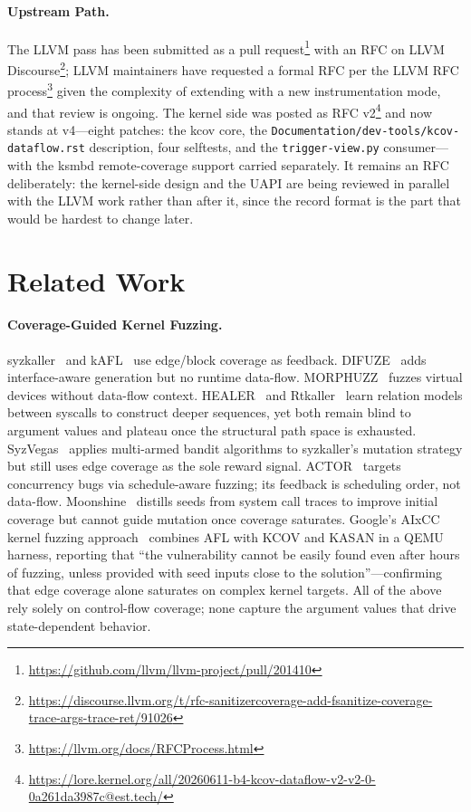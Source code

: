 \documentclass{article}
\begin{document}
\paragraph{Upstream Path.} The LLVM pass has been submitted as a pull
request\footnote{\url{https://github.com/llvm/llvm-project/pull/201410}} with
an RFC on LLVM
Discourse\footnote{\url{https://discourse.llvm.org/t/rfc-sanitizercoverage-add-fsanitize-coverage-trace-args-trace-ret/91026}};
LLVM maintainers have requested a formal RFC per the LLVM RFC
process\footnote{\url{https://llvm.org/docs/RFCProcess.html}} given the
complexity of extending \sancov with a new instrumentation mode, and that
review is ongoing. The kernel side was posted as RFC
v2\footnote{\url{https://lore.kernel.org/all/20260611-b4-kcov-dataflow-v2-v2-0-0a261da3987c@est.tech/}}
and now stands at v4---eight patches: the kcov core, the
\texttt{Documentation/dev-tools/kcov-dataflow.rst} description, four selftests,
and the \texttt{trigger-view.py} consumer---with the ksmbd remote-coverage
support carried separately. It remains an RFC deliberately: the kernel-side
design and the UAPI are being reviewed in parallel with the LLVM work rather
than after it, since the record format is the part that would be hardest to
change later.

\section{Related Work}\label{sec:related}

\paragraph{Coverage-Guided Kernel Fuzzing.}
syzkaller~\cite{vyukov2015syzkaller} and kAFL~\cite{schumilo2017kafl} use
edge/block coverage as feedback. DIFUZE~\cite{corina2017difuze} adds
interface-aware generation but no runtime data-flow.
MORPHUZZ~\cite{bulekov2022morphuzz} fuzzes virtual devices without data-flow
context. HEALER~\cite{sun2021healer} and
Rtkaller~\cite{ma2022rtkaller} learn relation models between syscalls to
construct deeper sequences, yet both remain blind to argument values and
plateau once the structural path space is exhausted.
SyzVegas~\cite{wang2021syzvegas} applies multi-armed bandit algorithms to
syzkaller's mutation strategy but still uses edge coverage as the sole reward
signal. ACTOR~\cite{fleischer2023actor} targets concurrency bugs via
schedule-aware fuzzing; its feedback is scheduling order, not data-flow.
Moonshine~\cite{pailoor2018moonshine} distills seeds from system call traces
to improve initial coverage but cannot guide mutation once coverage saturates.
Google's AIxCC kernel fuzzing approach~\cite{google2024aixcc} combines AFL
with KCOV and KASAN in a QEMU harness, reporting that ``the vulnerability
cannot be easily found even after hours of fuzzing, unless provided with seed
inputs close to the solution''---confirming that edge coverage alone saturates
on complex kernel targets.
All of the above rely solely on control-flow coverage; none capture the
argument values that drive state-dependent behavior.
\end{document}
